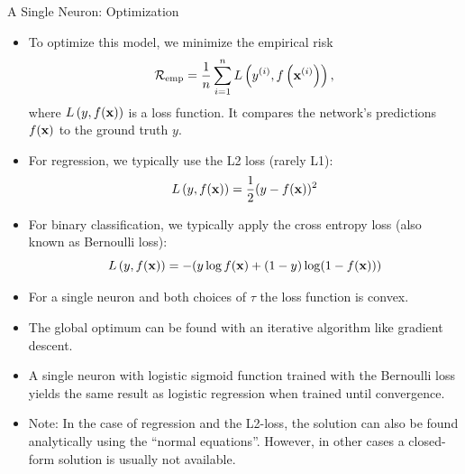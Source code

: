 \documentclass[11pt,compress,t,notes=noshow, xcolor=table]{beamer}
\begin{document}
\begin{vbframe} {A Single Neuron: Optimization}
\begin{itemize}
\item To optimize this model, we minimize the empirical risk 
$$\mathcal{R}_{\text{emp}} = \frac{1}{n} \sum\limits_{i=1}^n L\left(y^{(i)}, f\left(\mathbf{x}^{(i)}\right)\right),$$
where $L\left(y, f(\mathbf{x})\right)$ is a loss function. It compares the network's predictions $f(\mathbf{x})$ to the ground truth $y$. 
\item For regression, we typically use the L2 loss (rarely L1): $$L\left(y, f(\mathbf{x})\right) = \frac{1}{2}(y - f(\mathbf{x}))^2$$
\item For binary classification, we typically apply the cross entropy loss (also known as Bernoulli loss): $$L\left(y, f(\mathbf{x})\right) = -(y \log f(\mathbf{x}) + (1 - y) \log(1 - f(\mathbf{x})))$$
\framebreak 

\vspace{.5cm}
\item For a single neuron and both choices of $\tau$ the loss function is convex.
\item The global optimum can be found with an iterative algorithm like gradient descent. 
\item A single neuron with logistic sigmoid function trained with the Bernoulli loss %
 yields the %
 same result as logistic regression when trained until convergence.
\item Note: In the case of regression and the L2-loss, the solution can
also be found analytically using the “normal equations”. However, in other cases a closed-form solution is usually not available.
\end{itemize}
\end{vbframe} 

\endlecture
\end{document}
